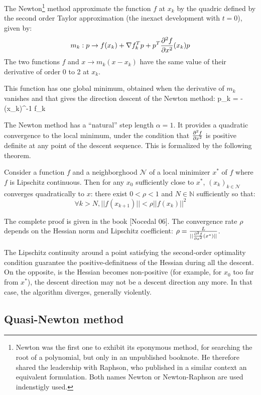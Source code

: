 \documentclass{book}
\begin{document}
The Newton\footnote{Newton was the first one to exhibit its eponymous method, for searching the root of a polynomial, but only in an unpublished booknote. He therefore shared the leadership with Raphson, who published in a similar context an equivalent formulation. Both names Newton or Newton-Raphson are used indenstigly used.}
 method approximate the function $f$ at $x_k$ by the quadric defined by the second order Taylor approximation (\mie the inexact development with $t=0$), given by:
\[ m_k: p \rightarrow f(x_k) + \nabla f_k^T p + p^T \frac{\partial^2{f}}{\partial{x}^2}(x_k) p \]
The two functions $f$ and $x \rightarrow m_k(x-x_k)$ have the same value of their derivative of order 0 to 2 at $x_k$. 

This function has one global minimum, obtained when the derivative of $m_k$ vanishes and that gives the direction descent of the Newton method:
 p_k = - (x_k)^{-1} \nabla f_k   \EOUT

The Newton method has a ``natural'' step length $\alpha = 1$. It provides a quadratic convergence to the local minimum, under the condition that $\frac{\partial^2{f}}{\partial{x}^2}$ is positive definite at any point of the descent sequence. This is formalized by the following theorem.

\begin{theorem}
Consider a function $f$ and a neighborghood $\mathcal{N}$ of a local minimizer $x^*$ of $f$ where $f$ is Lipschitz continuous. Then for any $x_0$ sufficiently close to $x^*$, $(x_k)_{k\in\mathcal{N}}$ converges quadratically to $x$: there exist $0<\rho<1$ and $N\in\mathbb{N}$ sufficiently so that:
\[ \forall k>N, || f(x_{k+1}) || < \rho || f(x_k) ||^2 \]
\end{theorem}
The complete proof is given in the book [Nocedal 06]. The convergence rate $\rho$ depends on the Hessian norm and Lipschitz coefficient: $\rho = \frac{L}{|| \frac{\partial^2{f}}{\partial{x}^2}(x^*) ||}$.

The Lipschitz continuity around a point satisfying the second-order optimality condition guarantee the positive-definitness of the Hessian during all the descent. On the opposite, is the Hessian becomes non-positive (for example, for $x_0$ too far from $x^*$), the descent direction  may not be a descent direction any more. In that case, the algorithm diverges, generally violently.

\subsection{Quasi-Newton method}
\end{document}
